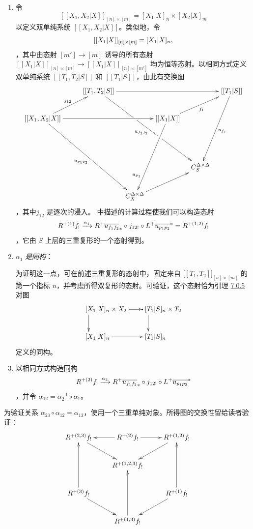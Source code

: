 \begin{enumerate}
\renewcommand{\theenumi}{\alph{enumi}}
\renewcommand{\labelenumi}{\theenumi)}
\item 令
\[
[[X_{1},X_{2}|X]]_{[n]\times [m]}=[X_{1}|X]_{n}\times
[X_{2}|X]_{m}
\]
以定义双单纯系统 $[[X_{1},X_{2}|X]]$。类似地，令
\[
[[X_{1}|X]]_{[n]\times[m]}=[X_{1}|X]_{n}{\quoi},
\]
，其中由态射 $[m']\rightarrow [m]$ 诱导的所有态射 $[[X_{1}|X]]_{[n]\times [m]}\rightarrow
[[X_{1}|X]]_{[n]\times [m']}$ 均为恒等态射。以相同方式定义双单纯系统 $[[T_{1},T_{2}|S]]$ 和 $[[T_{1}|S]]$，由此有交换图
\[
\xymatrix@C=1em{
  & & [[T_1,T_2|S]] \ar[rrrr]\ar'[dr][rrrddd]_(.2){u_{f_1f_2}}|(.38)\hole& &   & &  [[T_1|S]]\ar[lddd]^{u_{f_1}}\\
  [[X_1,X_2|X]]
  \ar[rrrr]\ar[rru]^{j_{12}}\ar[rrrddd]_{u_{p_1 p_2}} & &  & & [[X_1|X]]\ar[rru]_{j_1}\ar[lddd]_(.75){u_{p_1}}  \\
  & & & & &   &\\
  & & & & & C^{\Delta\times\Delta}_S\\
  &&& C^{\Delta\times\Delta}_X \ar[rru]
}
\]
，其中\pageoriginale $j_{12}$ 是逐次的浸入。 中描述的计算过程使我们可以构造态射
\[
R^{+(1)} f_{!}\xrightarrow{\alpha_{1}}R^{+}\bar{u_{f_{1}f_{2}}}\sisi{}{_*}\circ
j_{12!} \circ L^{+}\bar{u_{p_{1}p_{2}}}^{\sisi{+}{\ast}}=R^{{+}(1,2)}f_{!}
\]
，它由 $S$ 上层的三重复形的一个态射得到。

\item $\alpha_{1}$ \emph{是同构}：

为证明这一点，可在前述三重复形的态射中，固定来自 $\bigl[[T_{1},T_{2}]\bigr]_{[n]\times[m]}$ 的第一个指标 $n$，并考虑所得双复形的态射。可验证，这个态射恰为引理 \hyperref[XVII.constru7.0.5]{7.0.5} 对图
\[
\xymatrix{
**[r][X_1|X]_n \times X_2  \ar[r] \ar[d] & **[r][T_1|S]_n \times
T_2 \ar[d]\\
**[r][X_1|X]_n             \ar[r] & **[r][T_1|S]_n
}
\]
定义的同构。

\item 以相同方式构造同构
\[
R^{+(2)}f_{!}\xrightarrow{\alpha_{2}}R^{+}\bar{u_{f_{1}f_{2}}}_{\sisi{+}{*}}\circ
j_{12!} \circ L^{+}\bar{u_{p_{1}p_{2}}}\sisi{}{^*}
\]
，并令 $\alpha_{12}=\alpha^{-1}_{2}\circ \alpha_{1}$。
\end{enumerate}

为验证关系 $\alpha_{23}\circ \alpha_{12}=\alpha_{13}$，使用一个三重单纯对象。所得图的交换性留给读者验证：\pageoriginale
$$
\xymatrix{
  R^{+(2,3)}{f_!} \ar[rd]& R^{+(2)}f_! \ar[r] \ar[l]& R^{+(1,2)}f_! \ar[ld]\\
                &         R^{+(1,2,3)}f_!  &                  \\
R^{+(\sisi{2}{3})}f_! \ar[uu]\sisi{}{\ar[rd]}     &                         &  R^{+(1)}f_! \ar[uu]\sisi{}{\ar[ld]}\\
                &    R^{+(1,3)}f_! \ar[uu]        &
}
$$

